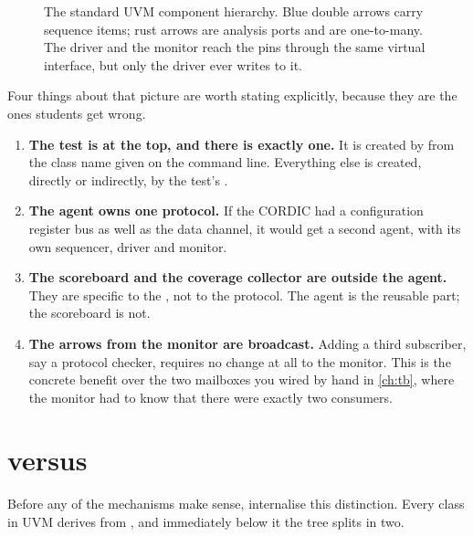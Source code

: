 \begin{figure}[htbp]
  \caption{The standard UVM component hierarchy. Blue double arrows carry
    sequence items; rust arrows are analysis ports and are one-to-many.
    The driver and the monitor reach the pins through the same virtual
    interface, but only the driver ever writes to it.}
  \label{fig:uvm:hierarchy}
\end{figure}

Four things about that picture are worth stating explicitly, because they are
the ones students get wrong.

\begin{enumerate}
  \item \textbf{The test is at the top, and there is exactly one.} It is
        created by  from the class name given on the
        command line. Everything else is created, directly or indirectly, by
        the test's .
  \item \textbf{The agent owns one protocol.} If the CORDIC had a
        configuration register bus as well as the data channel, it would get
        a second agent, with its own sequencer, driver and monitor.
  \item \textbf{The scoreboard and the coverage collector are outside the
        agent.} They are specific to the \DUT{}, not to the protocol. The
        agent is the reusable part; the scoreboard is not.
  \item \textbf{The arrows from the monitor are broadcast.} Adding a third
        subscriber, say a protocol checker, requires no change at all to the
        monitor. This is the concrete benefit over the two mailboxes you
        wired by hand in \cref{ch:tb}, where the monitor had to know that
        there were exactly two consumers.
\end{enumerate}

\section{ versus }
\label{sec:uvm:obj-comp}

%
Before any of the mechanisms make sense, internalise this distinction. Every
class in UVM derives from , and immediately below it the tree
splits in two.

